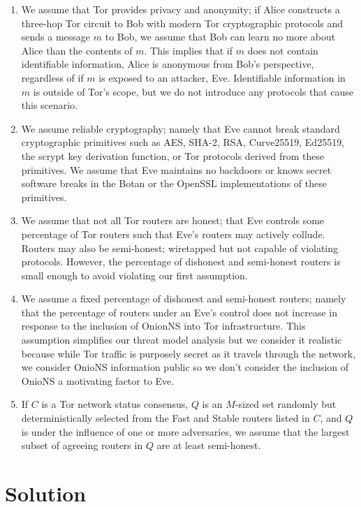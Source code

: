 \documentclass{sig-alternate}
\begin{document}
\begin{enumerate}
	\item We assume that Tor provides privacy and anonymity; if Alice constructs a three-hop Tor circuit to Bob with modern Tor cryptographic protocols and sends a message $ m $ to Bob, we assume that Bob can learn no more about Alice than the contents of $ m $. This implies that if $ m $ does not contain identifiable information, Alice is anonymous from Bob's perspective, regardless of if $ m $ is exposed to an attacker, Eve. Identifiable information in $ m $ is outside of Tor's scope, but we do not introduce any protocols that cause this scenario.
	\item We assume reliable cryptography; namely that Eve cannot break standard cryptographic primitives such as AES, SHA-2, RSA, Curve25519, Ed25519, the scrypt key derivation function, or Tor protocols derived from these primitives. We assume that Eve maintains no backdoors or knows secret software breaks in the Botan or the OpenSSL implementations of these primitives.
	\item We assume that not all Tor routers are honest; that Eve controls some percentage of Tor routers such that Eve's routers may actively collude. Routers may also be semi-honest; wiretapped but not capable of violating protocols. However, the percentage of dishonest and semi-honest routers is small enough to avoid violating our first assumption.
	\item We assume a fixed percentage of dishonest and semi-honest routers; namely that the percentage of routers under an Eve's control does not increase in response to the inclusion of OnionNS into Tor infrastructure. This assumption simplifies our threat model analysis but we consider it realistic because while Tor traffic is purposely secret as it travels through the network, we consider OnioNS information public so we don't consider the inclusion of OnioNS a motivating factor to Eve.
	\item If $ C $ is a Tor network status consensus, $ Q $ is an $ M $-sized set randomly but deterministically selected from the Fast and Stable routers listed in $ C $, and $ Q $ is under the influence of one or more adversaries, we assume that the largest subset of agreeing routers in $ Q $ are at least semi-honest.
\end{enumerate}

\section{Solution}
\label{sec:Solution}
\end{document}
